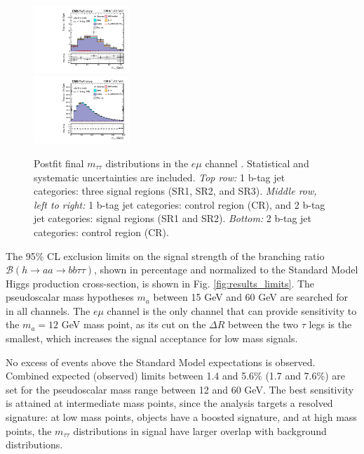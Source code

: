 \begin{figure}[ht]
\begin{center}
        \includegraphics[width=0.32\textwidth]{figures/ch-13-results/em_all_6_post_prelim-yes.pdf}\\
        \includegraphics[width=0.32\textwidth]{figures/ch-13-results/em_all_7_post_prelim-yes.pdf}
    \end{center}
    \caption[Postfit final $m_{\tau\tau}$ distributions in the $e\mu$ channel.]{Postfit final $m_{\tau\tau}$ distributions in the $e\mu$ channel \cite{CMS-AN-20-213}. Statistical and systematic uncertainties are included. \textit{Top row:} 1 b-tag jet categories: three signal regions (SR1, SR2, and SR3). \textit{Middle row, left to right:} 1 b-tag jet categories: control region (CR), and 2 b-tag jet categories: signal regions (SR1 and SR2). \textit{Bottom:} 2 b-tag jet categories: control region (CR).}
    \label{fig:results_mtt_postfit_emall}
\end{figure}


The 95\% CL exclusion limits on the signal strength of the branching ratio $\mathcal{B}(h \rightarrow aa \rightarrow bb\tau\tau)$, shown in percentage and normalized to the Standard Model Higgs production cross-section, is shown in Fig. \ref{fig:results_limits}. The pseudoscalar mass hypotheses $m_a$ between 15 GeV and 60 GeV are searched for in all channels. The $e\mu$ channel is the only channel that can provide sensitivity to the $m_a = 12$ GeV mass point, as its cut on the $\Delta R$ between the two $\tau$ legs is the smallest, which increases the signal acceptance for low mass signals.

No excess of events above the Standard Model expectations is observed. Combined expected (observed) limits between 1.4 and 5.6\% (1.7 and 7.6\%) are set for the pseudoscalar mass range between 12 and 60 GeV. The best sensitivity is attained at intermediate mass points, since the analysis targets a resolved signature: at low mass points, objects have a boosted signature, and at high mass points, the $m_{\tau\tau}$ distributions in signal have larger overlap with background distributions.

